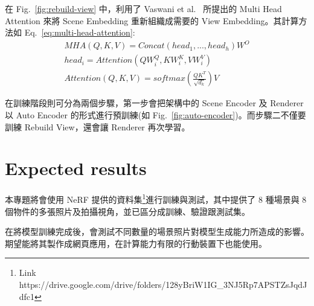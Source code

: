 \documentclass[10pt,twocolumn,letterpaper]{article}
\begin{document}
\begin{CJK}{UTF8}{bkai}
   在 Fig.~\ref{fig:rebuild-view} 中，利用了 Vaswani et al.~\cite{AttentionIsAllYouNeed} 所提出的
   Multi Head Attention 來將 Scene Embedding 重新組織成需要的 View Embedding。其計算方法如 Eq.~\ref{eq:multi-head-attention}:
   \begin{equation}
      \begin{aligned}
         MHA(Q, K, V) = Concat(head_{1},...,head_{h})W^{O}      \\
         head_{i} = Attention(QW^{Q}_{i},KW^{K}_{i},VW^{V}_{i}) \\
         Attention(Q, K, V ) = softmax(\frac{QK^{T}}{\sqrt{d_{k}}})V
      \end{aligned}
      \label{eq:multi-head-attention}
   \end{equation}

   在訓練階段則可分為兩個步驟，第一步會把架構中的 Scene Encoder 及 Renderer 以 Auto Encoder 的形式進行預訓練(如
   Fig.~\ref{fig:auto-encoder})。而步驟二不僅要訓練 Rebuild View，還會讓 Renderer 再次學習。

   \section{Expected results}
   本專題將會使用 NeRF 提供的資料集\footnote{Link https://drive.google.com/drive/folders/128yBriW1IG\_3NJ5Rp7APSTZsJqdJdfc1}進行訓練與測試，其中提供了
   8 種場景與 8 個物件的多張照片及拍攝視角，並已區分成訓練、驗證跟測試集。

   在將模型訓練完成後，會測試不同數量的場景照片對模型生成能力所造成的影響。期望能將其製作成網頁應用，在計算能力有限的行動裝置下也能使用。

   {\small
   
   
   }
\end{CJK}
\end{document}
